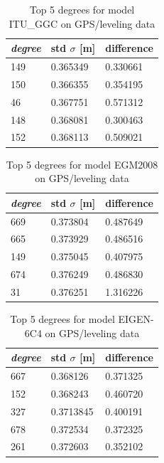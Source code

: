             \begin{table}[]
            	\centering
            	\caption{Top 5 degrees for model ITU\_GGC on GPS/leveling data}
            	\label{table:ggm_models}
            	\begin{tabular}{@{}lll@{}}
            		\toprule
            		\emph{degree} & std $\sigma$ [m]  & difference\\ \midrule
            		149 &0.365349&    0.330661\\
            		150 &0.366355&   0.354195\\
            		46 &0.367751 &  0.571312\\
            		148 &0.368081 &  0.300463\\
            		152 &0.368113  & 0.509021\\
            		\bottomrule
            		
            	\end{tabular}
            \end{table}
            
            
              \begin{table}[]
              	\centering
              	\caption{Top 5 degrees for model EGM2008 on GPS/leveling data}
              	\label{table:ggm_models}
              	\begin{tabular}{@{}lll@{}}
              		\toprule
              		\emph{degree} & std $\sigma$ [m]  & difference\\ \midrule
              		669 &0.373804&    0.487649\\
              		665 &0.373929&   0.486516\\
              		149 &0.375045 &  0.407975\\
              		674 &0.376249 &  0.486830\\
              		31 &0.376251  & 1.316226\\
              		\bottomrule
              		
              	\end{tabular}
              \end{table}
              
              \begin{table}
               	\centering
               	\caption{Top 5 degrees for model EIGEN-6C4 on GPS/leveling data}
               	\label{table:ggm_models}
               	\begin{tabular}{@{}lll@{}}
               		\toprule
               		\emph{degree} & std $\sigma$ [m]  & difference\\ \midrule
               		667 &0.368126&    0.371325\\
               		152 &0.368243&   0.460720\\
               		327 &0.3713845 &  0.400191\\
               		678 &0.372534 &  0.372325\\
               		261 &0.372603  & 0.352102\\
               		\bottomrule
               		
               	\end{tabular}
               \end{table}
        
